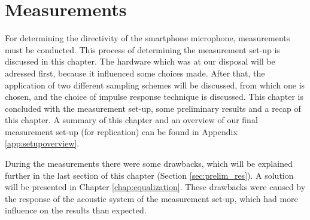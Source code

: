\chapter{Measurements}
\label{chap:measurements}
For determining the directivity of the smartphone microphone, measurements must be conducted.
This process of determining the measurement set-up is discussed in this chapter. 
The hardware which was at our disposal will be adressed first, because it influenced some choices made.
After that, the application of two different sampling schemes will be discussed, from which one is chosen, and the choice of impulse response technique is discussed.
This chapter is concluded with the measurement set-up, some preliminary results and a recap of this chapter.
A summary of this chapter and an overview of our final measurement set-up (for replication) can be found in Appendix \ref{app:setupoverview}. 

During the measurements there were some drawbacks, which will be explained further in the last section of this chapter (Section \ref{sec:prelim_res}).
A solution will be presented in Chapter \ref{chap:equalization}.
These drawbacks were caused by the response of the acoustic system of the measurement set-up, which had more influence on the results than expected.

